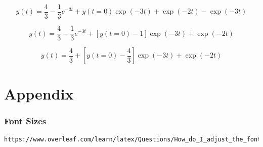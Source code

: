 \documentclass[17pt]{extarticle}
\begin{document}
$$y(t)   =  \frac{4}{3} - \frac{1}{3} e^{-3t}+ y(t=0) \exp(-3t) + \exp(-2t) - \exp(-3t)$$

$$y(t)   =  \frac{4}{3} - \frac{1}{3} e^{-3t}+ [y(t=0)-1] \exp(-3t) + \exp(-2t) $$

$$y(t)   =  \frac{4}{3} + \left[y(t=0)-\frac{4}{3} \right] \exp(-3t) + \exp(-2t) $$

\part{Appendix}

\section{Font Sizes}

\begin{verbatim}
https://www.overleaf.com/learn/latex/Questions/How_do_I_adjust_the_font_size%3F
\end{verbatim}
\end{document}
